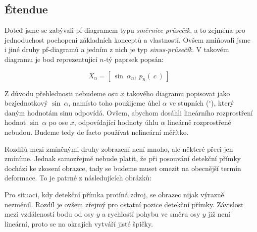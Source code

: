 

\subsection{Étendue}

Doteď jsme se zabývali pf-diagramem typu \emph{směrnice-průsečík}, a to zejména pro jednoduchost pochopeni základních konceptů a vlastností. Ovšem zmiňovali jsme i jiné druhy pf-diagramů a jedním z nich je typ \emph{sinus-průsečík}. V takovém diagramu je bod reprezentující $n$-tý paprsek popsán:

\[ X_n = [\ \sin\ \alpha_n,\ p_n(\ c\ )\ ] \]

Z důvodu přehlednosti nebudeme osu $x$ takového diagramu popisovat jako bezjednotkový $\sin\ \alpha$, namísto toho použijeme úhel $\alpha$ ve stupních ($^{\circ}$), který daným hodnotám sinu odpovídá. Ovšem, abychom dosáhli lineárního rozprostření hodnot $\sin\ \alpha$ po ose $x$, odpovídající hodnoty úhlu $\alpha$ lineárně rozprostřené nebudou. Budeme tedy de facto používat nelineární měřítko.

Rozdílů mezi zmíněnými druhy zobrazení není mnoho, ale některé přeci jen zmíníme. Jednak samozřejmě nebude platit, že při posouvání detekční přímky dochází ke zkosení obrazce, tady se budeme muset omezit na obecnější termín deformace. To je patrné z následujících obrázků:


Pro situaci, kdy detekční přímka protíná zdroj, se obrazec nijak výrazně nezměnil. Rozdíl je ovšem zřejmý pro ostatní pozice detekční přímky. Závislost mezi vzdáleností bodu od osy $y$ a rychlostí pohybu ve směru osy $y$ již není lineární, proto se na okrajích vytváří jisté špičky.


